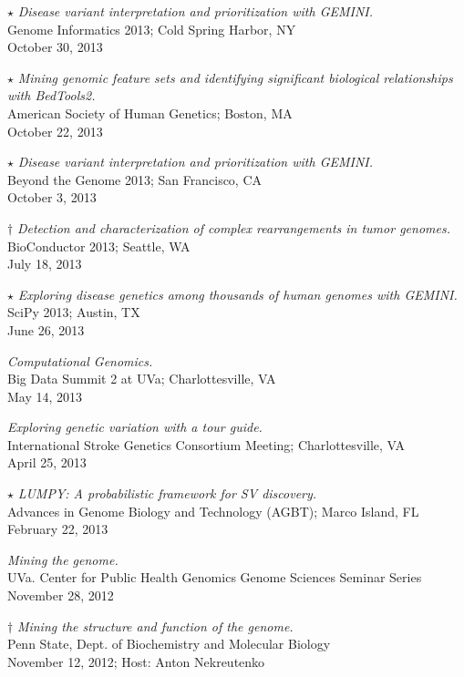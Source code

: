 \documentclass[margin,line]{cv}
\begin{document}
\begin{resume}
    $\star$ \textit{Disease variant interpretation and prioritization with GEMINI.} \\
    Genome Informatics 2013; Cold Spring Harbor, NY \\
    October 30, 2013

    $\star$ \textit{Mining genomic feature sets and identifying significant biological relationships with BedTools2.} \\
    American Society of Human Genetics; Boston, MA \\
    October 22, 2013

    $\star$ \textit{Disease variant interpretation and prioritization with GEMINI.} \\
    Beyond the Genome 2013; San Francisco, CA \\
    October 3, 2013

    $\dagger$ \textit{Detection and characterization of complex rearrangements in
	tumor genomes.} \\
    BioConductor 2013; Seattle, WA \\
    July 18, 2013

    $\star$ \textit{Exploring disease genetics among thousands of human genomes
	with GEMINI.} \\
    SciPy 2013; Austin, TX \\
    June 26, 2013

    \textit{Computational Genomics.} \\
    Big Data Summit 2 at UVa; Charlottesville, VA \\
    May 14, 2013

    \textit{Exploring genetic variation with a tour guide.} \\
    International Stroke Genetics Consortium Meeting; Charlottesville, VA \\
    April 25, 2013

    $\star$ \textit{LUMPY: A probabilistic framework for SV discovery.} \\
    Advances in Genome Biology and Technology (AGBT); Marco Island, FL \\
    February 22, 2013

    \textit{Mining the genome.} \\
    UVa. Center for Public Health Genomics Genome Sciences Seminar Series \\
    November 28, 2012

    $\dagger$ \textit{Mining the structure and function of the genome.} \\
    Penn State, Dept. of Biochemistry and Molecular Biology \\
    November 12, 2012; Host: Anton Nekreutenko


\end{resume}
\end{document}
